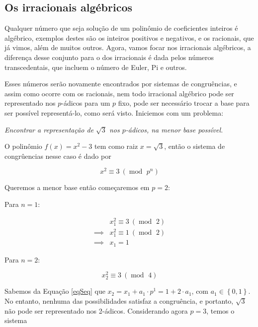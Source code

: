 \documentclass{report}
\DeclareMathOperator{\modulo}{mod \ }
\theoremstyle{definition}
\begin{document}
\subsection{Os irracionais algébricos}

Qualquer número que seja solução de um polinômio de coeficientes inteiros é algébrico, exemplos destes são os inteiros positivos e negativos, e os racionais, que já vimos, além de muitos outros. Agora, vamos focar nos irracionais algébricos, a diferença desse conjunto para o dos irracionais é dada pelos números transcedentais, que incluem o número de Euler, Pi e outros. 

Esses números serão novamente encontrados por sistemas de congruências, e assim como ocorre com os racionais, nem todo irracional algébrico pode ser representado nos $p$-ádicos para um $p$ fixo, pode ser necessário trocar a base para ser possível representá-lo, como será visto. Iniciemos com um problema: 

\bigskip

\centerline{\textit{Encontrar a representação de $\mathit{\sqrt{3}}$ nos $p$-ádicos, na menor base possível.}}

\bigskip

O polinômio $f(x) = x^2 - 3$ tem como raiz $x = \sqrt{3}$, então o sistema de congrûencias nesse caso é dado por

\vspace*{-5pt}
\begin{equation*}
    x^2 \equiv 3 \ (\modulo p^n)
\end{equation*}

Queremos a menor base então começaremos em $p=2$:

\smallskip

Para $n=1$:

\vspace*{-5pt}
\begin{align*}
             & x_1^2 \equiv 3 \ (\modulo 2) \\
    \implies & x_1^2 \equiv 1 \ (\modulo 2) \\
    \implies & x_1 = 1
\end{align*}

Para $n=2$:

\begin{equation*}
    x_2^2 \equiv 3 \ (\modulo 4)
\end{equation*}

Sabemos da Equação \ref{eqSeq} que $x_2 = x_1 + a_1 \cdot p^1 = 1 + 2 \cdot a_1$, com $a_1 \in \left\lbrace 0,1 \right\rbrace$. No entanto, nenhuma das possibilidades satisfaz a congruência, e portanto, $\sqrt{3}$ não pode ser representado nos 2-ádicos. Considerando agora $p=3$, temos o sistema
\end{document}
